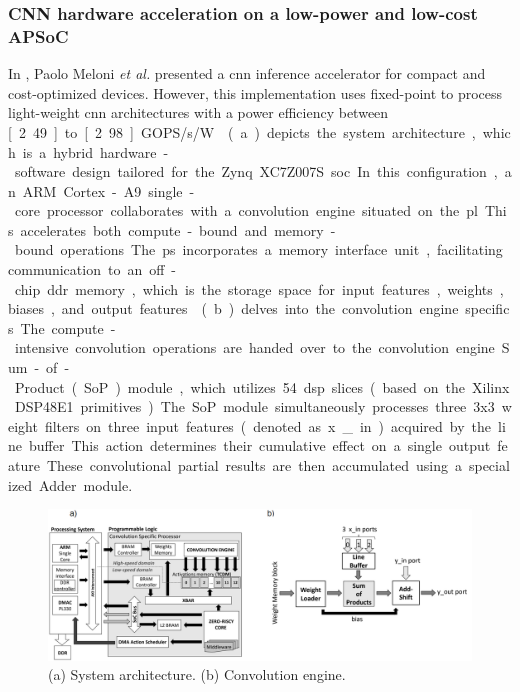 \FloatBarrier

\subsubsection{CNN hardware acceleration on a low-power and low-cost APSoC}
In \cite{meloni2019cnn}, Paolo Meloni \textit{et al.} presented a \gls{cnn} inference accelerator for compact and cost-optimized devices. However, this implementation uses fixed-point to process light-weight \gls{cnn} architectures with a power efficiency between \unit[2.49] to \unit[2.98]{GOPS/s/W}.

(a) depicts the system architecture, which is a hybrid hardware-software design tailored for the Zynq XC7Z007S \gls{soc}. In this configuration, an ARM Cortex-A9 single-core processor collaborates with a convolution engine situated on the \gls{pl}. This accelerates both compute-bound and memory-bound operations. The \gls{ps} incorporates a memory interface unit, facilitating communication to an off-chip \gls{ddr} memory, which is the storage space for input features, weights, biases, and output features.

(b) delves into the convolution engine specifics. The compute-intensive convolution operations are handed over to the convolution engine Sum-of-Product (SoP) module, which utilizes 54 \gls{dsp} slices (based on the Xilinx DSP48E1 primitives). The SoP module simultaneously processes three 3x3 weight filters on three input features (denoted as x\_in) acquired by the line buffer. This action determines their cumulative effect on a single output feature. These convolutional partial results are then accumulated using a specialized Adder module.

\begin{figure}[h!]
	\centering
	\includegraphics[width=\textwidth]{./figures/4_g.png}
	\caption{(a) System architecture. (b) Convolution engine.}
	\label{fig:meloni2019cnn}
\end{figure}
\FloatBarrier


